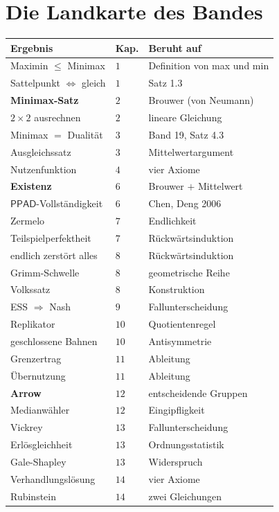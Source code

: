 \section{Die Landkarte des Bandes}

\begin{merksatz}
\begin{center}
{\small
\renewcommand{\arraystretch}{1.42}
\begin{tabular}{@{}P{3.4cm}P{1.2cm}P{3.6cm}@{}}
\toprule
\textbf{Ergebnis} & \textbf{Kap.} & \textbf{Beruht auf}\\
\midrule
Maximin $\le$ Minimax & $1$ & Definition von max und min\\
Sattelpunkt $\iff$ gleich & $1$ & Satz 1.3\\
\textbf{Minimax-Satz} & $2$ & Brouwer (von Neumann)\\
$2\times2$ ausrechnen & $2$ & lineare Gleichung\\
Minimax $=$ Dualität & $3$ & Band 19, Satz 4.3\\
Ausgleichssatz & $3$ & Mittelwertargument\\
Nutzenfunktion & $4$ & vier Axiome\\
\textbf{Existenz} & $6$ & Brouwer $+$ Mittelwert\\
$\mathsf{PPAD}$-Vollständigkeit & $6$ & Chen, Deng 2006\\
Zermelo & $7$ & Endlichkeit\\
Teilspielperfektheit & $7$ & Rückwärtsinduktion\\
endlich zerstört alles & $8$ & Rückwärtsinduktion\\
Grimm-Schwelle & $8$ & geometrische Reihe\\
Volkssatz & $8$ & Konstruktion\\
ESS $\Rightarrow$ Nash & $9$ & Fallunterscheidung\\
Replikator & $10$ & Quotientenregel\\
geschlossene Bahnen & $10$ & Antisymmetrie\\
Grenzertrag & $11$ & Ableitung\\
Übernutzung & $11$ & Ableitung\\
\textbf{Arrow} & $12$ & entscheidende Gruppen\\
Medianwähler & $12$ & Eingipfligkeit\\
Vickrey & $13$ & Fallunterscheidung\\
Erlösgleichheit & $13$ & Ordnungsstatistik\\
Gale-Shapley & $13$ & Widerspruch\\
Verhandlungslösung & $14$ & vier Axiome\\
Rubinstein & $14$ & zwei Gleichungen\\
\bottomrule
\end{tabular}}
\end{center}
\end{merksatz}

